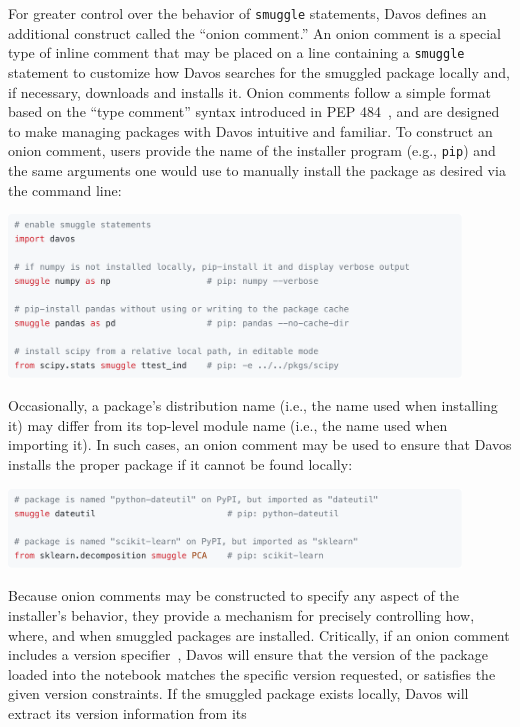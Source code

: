 \documentclass[preprint,12pt,a4paper]{elsarticle}
\begin{document}
For greater control over the behavior of \texttt{smuggle} statements, Davos
defines an additional construct called the ``onion comment.'' An onion comment
is a special type of inline comment that may be placed on a line containing a
\texttt{smuggle} statement to customize how Davos searches for the smuggled
package locally and, if necessary, downloads and installs it. Onion comments
follow a simple format based on the ``type comment'' syntax introduced in PEP
484~\cite{vanREtal14}, and are designed to make managing packages with Davos
intuitive and familiar. To construct an onion comment, users provide the name
of the installer program (e.g., \texttt{pip}) and the same arguments one would
use to manually install the package as desired via the command line:
\begin{center} \includegraphics[width=0.9\textwidth]{figs/snippet1}
\end{center} Occasionally, a package's distribution name (i.e., the name used
when installing it) may differ from its top-level module name (i.e., the name
used when importing it). In such cases, an onion comment may be used to ensure
that Davos installs the proper package if it cannot be found locally:
\begin{center} \includegraphics[width=0.9\textwidth]{figs/snippet2}
\end{center} Because onion comments may be constructed to specify any aspect of
the installer's behavior, they provide a mechanism for precisely controlling
how, where, and when smuggled packages are installed. Critically, if an onion
comment includes a version specifier~\cite{CoghStuf13}, Davos will ensure that
the version of the package loaded into the notebook matches the specific
version requested, or satisfies the given version constraints. If the smuggled
package exists locally, Davos will extract its version information from its
\end{document}
